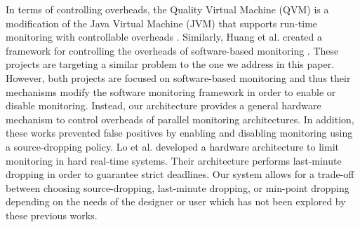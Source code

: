 In terms of controlling overheads, the Quality Virtual Machine (QVM) is a
modification of the Java Virtual Machine (JVM) that supports run-time
monitoring with controllable overheads \cite{qvm-oopsla08}. Similarly, Huang et
al. created a framework for controlling the overheads of software-based
monitoring \cite{huang-sttt12}. These projects are targeting a similar problem
to the one we address in this paper. However, both projects are focused on
software-based monitoring and thus their mechanisms modify the software
monitoring framework in order to enable or disable monitoring. Instead, our
architecture provides a general hardware mechanism to control overheads of
parallel monitoring architectures. In addition, these works prevented
false positives by enabling and disabling monitoring using a source-dropping
policy. Lo et al. \cite{lo-rtas14} developed a hardware architecture to limit
monitoring in hard real-time systems. Their architecture performs last-minute
dropping in order to guarantee strict deadlines. Our system allows for a
trade-off between choosing source-dropping, last-minute dropping, or min-point
dropping depending on the needs of the designer or user which has not been
explored by these previous works. 
